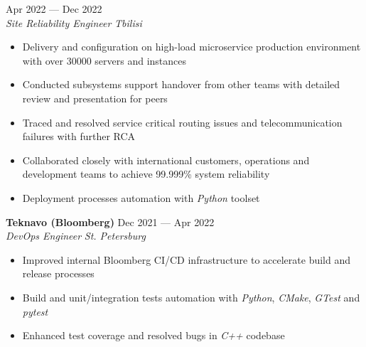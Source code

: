 \documentclass[10pt]{report}
\newenvironment{JobDescription}[5]{
    \vspace{ #5 }
    \flushleft
    {\bf #1 } \hfill { #2 }
    \\
    {\em #3 } \hfill {\em #4 }
    \begin{itemize}
} {
    \end{itemize}
}
\begin{document}
\begin{JobDescription}{}{Apr 2022 --- Dec 2022}{Site Reliability Engineer}{Tbilisi}{-3mm}
    \item Delivery and configuration on high-load microservice production environment with over 30000 servers and instances
    \item Conducted subsystems support handover from other teams with detailed review and presentation for peers
    \item Traced and resolved service critical routing issues and telecommunication failures with further RCA
    \item Collaborated closely with international customers, operations and development teams to achieve 99.999\% system reliability
    \item Deployment processes automation with \emph{Python} toolset
\end{JobDescription}

\begin{JobDescription}{Teknavo (Bloomberg)}{Dec 2021 --- Apr 2022}{DevOps Engineer}{St. Petersburg}{5mm}
    \item Improved internal Bloomberg CI/CD infrastructure to accelerate build and release processes
    \item Build and unit/integration tests automation with \emph{Python}, \emph{CMake}, \emph{GTest} and \emph{pytest}
    \item Enhanced test coverage and resolved bugs in \emph{C++} codebase
\end{JobDescription}

\goodbreak
\end{document}
